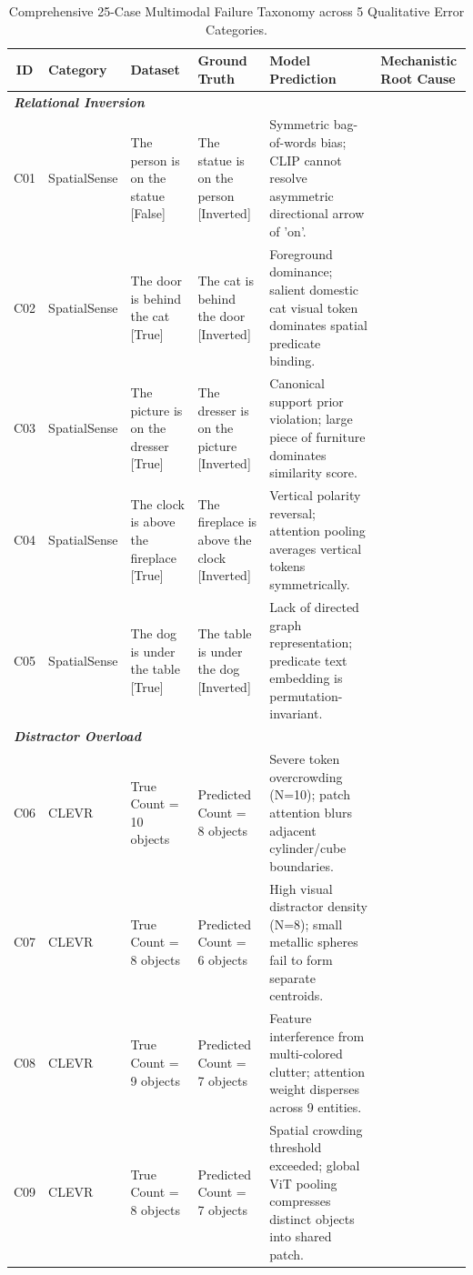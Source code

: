 \begin{table}[t]
\centering
\caption{Comprehensive 25-Case Multimodal Failure Taxonomy across 5 Qualitative Error Categories.}
\label{tab:failure_taxonomy}
\small
\begin{tabular}{c l l p{3.2cm} p{3.2cm} p{4.8cm}}
\toprule
\textbf{ID} & \textbf{Category} & \textbf{Dataset} & \textbf{Ground Truth} & \textbf{Model Prediction} & \textbf{Mechanistic Root Cause} \\
\midrule
\multicolumn{6}{l}{\textbf{\textit{Relational Inversion}}} \\ \midrule
C01 & SpatialSense & The person is on the statue [False] & The statue is on the person [Inverted] & Symmetric bag-of-words bias; CLIP cannot resolve asymmetric directional arrow of 'on'. \\
C02 & SpatialSense & The door is behind the cat [True] & The cat is behind the door [Inverted] & Foreground dominance; salient domestic cat visual token dominates spatial predicate binding. \\
C03 & SpatialSense & The picture is on the dresser [True] & The dresser is on the picture [Inverted] & Canonical support prior violation; large piece of furniture dominates similarity score. \\
C04 & SpatialSense & The clock is above the fireplace [True] & The fireplace is above the clock [Inverted] & Vertical polarity reversal; attention pooling averages vertical tokens symmetrically. \\
C05 & SpatialSense & The dog is under the table [True] & The table is under the dog [Inverted] & Lack of directed graph representation; predicate text embedding is permutation-invariant. \\
\multicolumn{6}{l}{\textbf{\textit{Distractor Overload}}} \\ \midrule
C06 & CLEVR & True Count = 10 objects & Predicted Count = 8 objects & Severe token overcrowding (N=10); patch attention blurs adjacent cylinder/cube boundaries. \\
C07 & CLEVR & True Count = 8 objects & Predicted Count = 6 objects & High visual distractor density (N=8); small metallic spheres fail to form separate centroids. \\
C08 & CLEVR & True Count = 9 objects & Predicted Count = 7 objects & Feature interference from multi-colored clutter; attention weight disperses across 9 entities. \\
C09 & CLEVR & True Count = 8 objects & Predicted Count = 7 objects & Spatial crowding threshold exceeded; global ViT pooling compresses distinct objects into shared patch. \\

\end{tabular}
\end{table}
